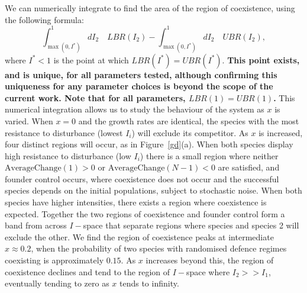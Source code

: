 We can numerically integrate to find the area of the region of coexistence, using the following formula:
\begin{equation}
\int_{\max(0,I^*)}^1 dI_2\quad LBR(I_2) - \int_{\max(0,I^*)}^1 dI_2\quad UBR(I_2),
\end{equation}
where $I^*<1$ is the point at which $LBR(I^*)=UBR(I^*)$. \textbf{This point exists, and is unique, for all parameters tested, although confirming this uniqueness for any parameter choices is beyond the scope of the current work. Note that for all parameters, $LBR(1)=UBR(1)$.} This numerical integration allows us to study the behaviour of the system as $x$ is varied. When $x=0$ and the growth rates are identical, the species with the most resistance to disturbance (lowest $I_i$) will exclude its competitor.  As $x$ is increased, four distinct regions will occur, as in Figure~\ref{gd}(a). When both species display high resistance to disturbance (low $I_i$) there is a small region where neither $\text{AverageChange}(1)>0$ or $\text{AverageChange}(N-1)<0$ are satisfied, and founder control occurs, where coexistence does not occur and the successful species depends on the initial populations, subject to stochastic noise. When both species have higher intensities, there exists a region where coexistence is expected. Together the two regions of coexistence and founder control form a band from across $I-$space that separate regions where species and species 2 will exclude the other. We find the region of coexistence peaks at intermediate $x \approx 0.2$, when the probability of two species with randomised defence regimes coexisting is approximately $0.15$. As $x$ increases beyond this, the region of coexistence declines and tend to the region of $I-$space where $I_2>>I_1$, eventually tending to zero as $x$ tends to infinity.

